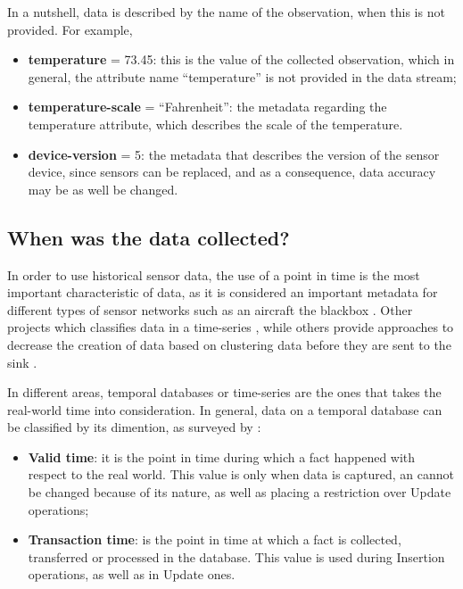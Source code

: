 In a nutshell, data is described by the name of the observation, when this is
not provided. For example, 

\begin{itemize}
  \item \textbf{temperature} = 73.45: this is the value of the collected
  observation, which in general, the attribute name ``temperature'' is not
  provided in the data stream;
  \item \textbf{temperature-scale} = ``Fahrenheit'': the metadata regarding the
  temperature attribute, which describes the scale of the temperature.
  \item \textbf{device-version} = 5: the metadata that describes the version of
  the sensor device, since sensors can be replaced, and as a consequence, data
  accuracy may be as well be changed.
\end{itemize} 

\subsection{When was the data collected?}

In order to use historical sensor data, the use of a point in time is the most
important characteristic of data, as it is considered an important metadata
for different types of sensor networks such as an aircraft the blackbox
\cite{sn-exemple-blackbox}. Other projects which classifies data in a
time-series \cite{sn-time-series-example}, while others provide approaches to
decrease the creation of data based on clustering data before they are sent to
the sink \cite{sn-time-series}.

In different areas, temporal databases or time-series are the ones that takes
the real-world time into consideration. In general, data on a temporal
database can be classified by its dimention, as surveyed by \cite{db-temporal}:

\begin{itemize}
  \item \textbf{Valid time}: it is the point in time during which a fact
  happened with respect to the real world. This value is only when data is captured, an
  cannot be changed because of its nature, as well as placing a restriction over
  Update operations;
  \item \textbf{Transaction time}: is the point in time at which a fact is
  collected, transferred or processed in the database. This value is used
  during Insertion operations, as well as in Update ones.
\end{itemize}

